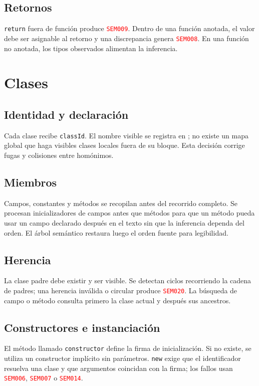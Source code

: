 \documentclass[11pt,letterpaper,oneside]{report}
\newcommand{\archivo}[1]{\path{#1}}
\newcommand{\codigo}[1]{\texttt{#1}}
\newcommand{\diag}[1]{\textcolor{red}{\texttt{#1}}}
\begin{document}
\subsection{Retornos}

\codigo{return} fuera de función produce \diag{SEM009}. Dentro de una función
anotada, el valor debe ser asignable al retorno y una discrepancia genera
\diag{SEM008}. En una función no anotada, los tipos observados alimentan la inferencia.

\section{Clases}

\subsection{Identidad y declaración}

Cada clase recibe \codigo{classId}. El nombre visible se registra en
\archivo{ScopeManager}; no existe un mapa global que haga visibles clases locales
fuera de su bloque. Esta decisión corrige fugas y colisiones entre homónimos.

\subsection{Miembros}

Campos, constantes y métodos se recopilan antes del recorrido completo. Se procesan
inicializadores de campos antes que métodos para que un método pueda usar un campo
declarado después en el texto sin que la inferencia dependa del orden. El árbol
semántico restaura luego el orden fuente para legibilidad.

\subsection{Herencia}

La clase padre debe existir y ser visible. Se detectan ciclos recorriendo la cadena de
padres; una herencia inválida o circular produce \diag{SEM020}. La búsqueda de campo o
método consulta primero la clase actual y después sus ancestros.

\subsection{Constructores e instanciación}

El método llamado \codigo{constructor} define la firma de inicialización. Si no
existe, se utiliza un constructor implícito sin parámetros. \codigo{new} exige que el
identificador resuelva una clase y que argumentos coincidan con la firma; los fallos
usan \diag{SEM006}, \diag{SEM007} o \diag{SEM014}.
\end{document}
